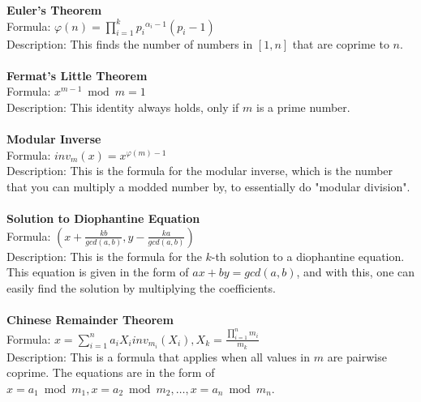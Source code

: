 \documentclass[12pt]{report}
\begin{document}
\textbf{Euler's Theorem}\\
Formula: \(\varphi(n)=\prod_{i=1}^{k}{{p_i}^{\alpha_i-1}(p_i-1)}\)\\
Description: This finds the number of numbers in \([1,n]\) that are coprime to \(n\).\\\\
\textbf{Fermat's Little Theorem}\\
Formula: \(x^{m-1}\bmod{m}=1\)\\
Description: This identity always holds, only if \(m\) is a prime number.\\\\
\textbf{Modular Inverse}\\
Formula: \(inv_m(x)=x^{\varphi(m)-1}\)\\
Description: This is the formula for the modular inverse, which is the number that you can multiply a modded number by, to essentially do "modular division".\\\\
\textbf{Solution to Diophantine Equation}\\
Formula: \((x+\frac{kb}{gcd(a,b)},y-\frac{ka}{gcd(a,b)})\)\\
Description: This is the formula for the \(k\)-th solution to a diophantine equation. This equation is given in the form of \(ax+by=gcd(a,b)\), and with this, one can easily find the solution by multiplying the coefficients.\\\\
\textbf{Chinese Remainder Theorem}\\
Formula: \(x=\sum_{i=1}^{n}{a_iX_iinv_{m_i}(X_i)},X_k=\frac{\prod_{i=1}^{n}{m_i}}{m_k}\)\\
Description: This is a formula that applies when all values in \(m\) are pairwise coprime. The equations are in the form of \(x=a_1\bmod{m_1},x=a_2\bmod{m_2},\dots,x=a_n\bmod{m_n}\).\\\\
\end{document}

